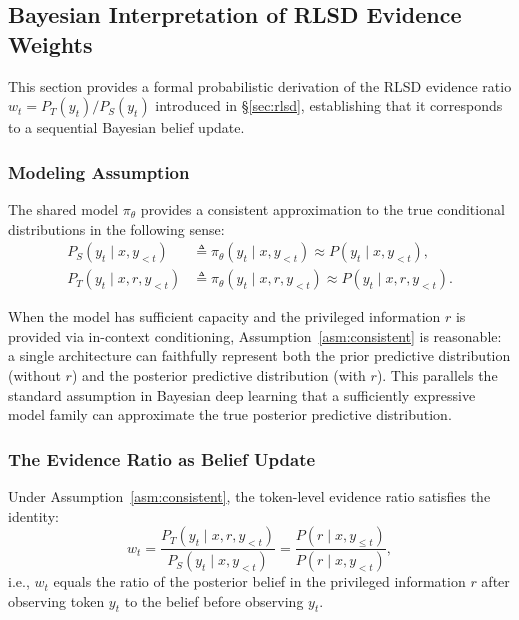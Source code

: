 \documentclass[]{jingdong}
\begin{document}

\subsection{Bayesian Interpretation of RLSD Evidence Weights}
\label{app:bayesian}

This section provides a formal probabilistic derivation of the RLSD evidence ratio $w_t = P_T(y_t)/P_S(y_t)$ introduced in \S\ref{sec:rlsd}, establishing that it corresponds to a sequential Bayesian belief update.

\subsubsection{Modeling Assumption}

\begin{assumption}
\label{asm:consistent}
The shared model $\pi_\theta$ provides a consistent approximation to the true conditional distributions in the following sense:
\begin{align}
    P_S(y_t \mid x, y_{<t}) &\triangleq \pi_\theta(y_t \mid x, y_{<t}) \approx P(y_t \mid x, y_{<t}), \\
    P_T(y_t \mid x, r, y_{<t}) &\triangleq \pi_\theta(y_t \mid x, r, y_{<t}) \approx P(y_t \mid x, r, y_{<t}).
\end{align}
\end{assumption}

When the model has sufficient capacity and the privileged information $r$ is provided via in-context conditioning, Assumption~\ref{asm:consistent} is reasonable: a single architecture can faithfully represent both the prior predictive distribution (without $r$) and the posterior predictive distribution (with $r$). This parallels the standard assumption in Bayesian deep learning that a sufficiently expressive model family can approximate the true posterior predictive distribution.


\subsubsection{The Evidence Ratio as Belief Update}

\begin{theorem}
\label{thm:bayesian}
Under Assumption~\ref{asm:consistent}, the token-level evidence ratio satisfies the identity:
\begin{equation}
    w_t = \frac{P_T(y_t \mid x, r, y_{<t})}{P_S(y_t \mid x, y_{<t})} = \frac{P(r \mid x, y_{\leq t})}{P(r \mid x, y_{<t})},
    \label{eq:belief-update}
\end{equation}
i.e., $w_t$ equals the ratio of the posterior belief in the privileged information $r$ after observing token $y_t$ to the belief before observing $y_t$.
\end{theorem}
\end{document}
